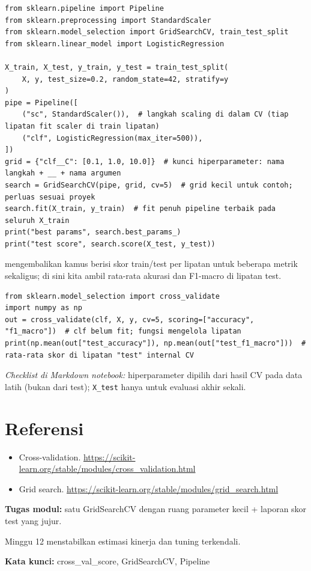 \documentclass[../main.tex]{subfiles}
\begin{document}
\begin{lstlisting}[caption={GridSearchCV pada pipeline + evaluasi test}]
from sklearn.pipeline import Pipeline
from sklearn.preprocessing import StandardScaler
from sklearn.model_selection import GridSearchCV, train_test_split
from sklearn.linear_model import LogisticRegression

X_train, X_test, y_train, y_test = train_test_split(
    X, y, test_size=0.2, random_state=42, stratify=y
)
pipe = Pipeline([
    ("sc", StandardScaler()),  # langkah scaling di dalam CV (tiap lipatan fit scaler di train lipatan)
    ("clf", LogisticRegression(max_iter=500)),
])
grid = {"clf__C": [0.1, 1.0, 10.0]}  # kunci hiperparameter: nama langkah + __ + nama argumen
search = GridSearchCV(pipe, grid, cv=5)  # grid kecil untuk contoh; perluas sesuai proyek
search.fit(X_train, y_train)  # fit penuh pipeline terbaik pada seluruh X_train
print("best params", search.best_params_)
print("test score", search.score(X_test, y_test))
\end{lstlisting}

\MulaiPenjelasanKode {} mengembalikan kamus berisi skor train/test per lipatan untuk beberapa metrik sekaligus; di sini kita ambil rata-rata akurasi dan F1-macro di lipatan test. \SelesaiPenjelasanKode

\begin{lstlisting}[caption={Cross-validate dengan beberapa metrik}]
from sklearn.model_selection import cross_validate
import numpy as np
out = cross_validate(clf, X, y, cv=5, scoring=["accuracy", "f1_macro"])  # clf belum fit; fungsi mengelola lipatan
print(np.mean(out["test_accuracy"]), np.mean(out["test_f1_macro"]))  # rata-rata skor di lipatan "test" internal CV
\end{lstlisting}

\noindent\textit{Checklist di Markdown notebook:} hiperparameter dipilih dari hasil CV pada data latih (bukan dari test); \texttt{X\_test} hanya untuk evaluasi akhir sekali.

\section{Referensi}

\begin{itemize}[leftmargin=*]
  \item Cross-validation. \url{https://scikit-learn.org/stable/modules/cross_validation.html}
  \item Grid search. \url{https://scikit-learn.org/stable/modules/grid_search.html}
\end{itemize}

\begin{asesmen}
\textbf{Tugas modul:} satu GridSearchCV dengan ruang parameter kecil + laporan skor test yang jujur.
\end{asesmen}

\begin{rangkuman}
Minggu 12 menstabilkan estimasi kinerja dan tuning terkendali.

\textbf{Kata kunci:} cross\_val\_score, GridSearchCV, Pipeline
\end{rangkuman}
\end{document}
